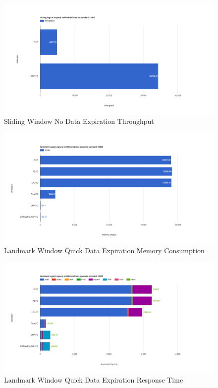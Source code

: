 \begin{figure}[!htbp]
	\centering
    \includegraphics[width=6.5in]{img/app3-slide-no-t.png}
    \caption{Sliding Window No Data Expiration Throughput}
\end{figure}
\begin{figure}[!htbp]
	\centering
    \includegraphics[width=6.5in]{img/app3-land-quick-m.png}
    \caption{Landmark Window Quick Data Expiration Memory Consumption}
\end{figure}
\begin{figure}[!htbp]
	\centering
    \includegraphics[width=6.5in]{img/app3-land-quick-r.png}
    \caption{Landmark Window Quick Data Expiration Response Time}
\end{figure}
